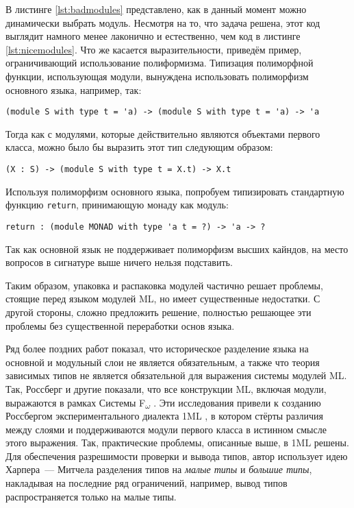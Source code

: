 \documentclass[../diploma.tex]{subfiles}
\begin{document}
В листинге \ref{lst:badmodules} представлено, как в данный момент можно динамически выбрать модуль. Несмотря на то, что задача решена, этот код выглядит намного менее лаконично и естественно, чем код в листинге \ref{lst:nicemodules}. Что же касается выразительности, приведём пример, ограничивающий использование полиформизма. Типизация полиморфной функции, использующая модули, вынуждена использовать полиморфизм основного языка, например, так:

\begin{verbatim}
(module S with type t = 'a) -> (module S with type t = 'a) -> 'a
\end{verbatim}

Тогда как с модулями, которые действительно являются объектами первого класса, можно было бы выразить этот тип следующим образом:
\begin{verbatim}
(X : S) -> (module S with type t = X.t) -> X.t
\end{verbatim}

Используя полиморфизм основного языка, попробуем типизировать стандартную функцию \texttt{return}, принимающую монаду как модуль:
\begin{verbatim}
return : (module MONAD with type 'a t = ?) -> 'a -> ?
\end{verbatim}

Так как основной язык не поддерживает полиморфизм высших кайндов, на место вопросов в сигнатуре выше ничего нельзя подставить. 

Таким образом, упаковка и распаковка модулей частично решает проблемы, стоящие перед языком модулей ML, но имеет существенные недостатки. С другой стороны, сложно предложить решение, полностью решающее эти проблемы без существенной переработки основ языка.

Ряд более поздних работ показал, что историческое разделение языка на основной и модульный слои не является обязательным, а также что теория зависимых типов не является обязательной для выражения системы модулей ML. Так, Россберг и другие показали, что все конструкции ML, включая модули, выражаются в рамках Системы F\textsubscript{$\omega$} \cite{fing}. Эти исследования привели к созданию Россбергом экспериментального диалекта 1ML \cite{1ml}, в котором стёрты различия между слоями и поддерживаются модули первого класса в истинном смысле этого выражения. Так, практические проблемы, описанные выше, в 1ML решены. Для обеспечения разрешимости проверки и вывода типов, автор использует идею Харпера~--- Митчела \cite{harper_mitchell} разделения типов на \textit{малые типы} и \textit{большие типы}, накладывая на последние ряд ограничений, например, вывод типов распространяется только на малые типы.  
\end{document}
